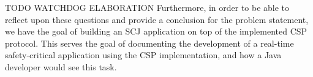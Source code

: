 TODO WATCHDOG ELABORATION
Furthermore, in order to be able to reflect upon these questions and provide a conclusion for the problem statement, we have the goal of building an SCJ application on top of the implemented CSP protocol. This serves the goal of documenting the development of a real-time safety-critical application using the CSP implementation, and how a Java developer would see this task.




